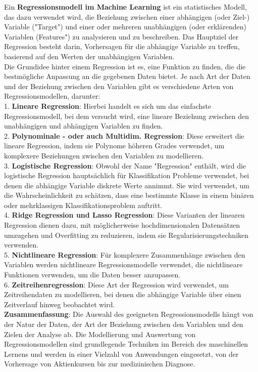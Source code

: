 \documentclass[12pt]{article}
\begin{document}
Ein \textbf{Regressionsmodell im Machine Learning} ist ein statistisches Modell, das dazu verwendet wird, die Beziehung zwischen einer abhängigen (oder Ziel-) Variable ("Target") und einer oder mehreren unabhängigen (oder erklärenden) Variablen (Features") zu analysieren und zu beschreiben. Das Hauptziel der Regression besteht darin, Vorhersagen für die abhängige Variable zu treffen, basierend auf den Werten der unabhängigen Variablen.\\
Die Grundidee hinter einem Regression ist es, eine Funktion zu finden, die die bestmögliche Anpassung an die gegebenen Daten bietet. Je nach Art der Daten und der Beziehung zwischen den Variablen gibt es verschiedene Arten von Regressionsmodellen, darunter:\\[0.2cm] 
% 
1. \textbf{Lineare Regression}: Hierbei handelt es sich um das einfachste Regressionsmodell, bei dem versucht wird, eine lineare Beziehung zwischen den unabhängigen und abhängigen Variablen zu finden.\\[0.2cm]
%  
2. \textbf{Polynominale - oder auch Multidim. Regression}: Diese erweitert die lineare Regression, indem sie Polynome höheren Grades verwendet, um komplexere Beziehungen zwischen den Variablen zu modellieren.\\[0.2cm]
% 
3. \textbf{Logistische Regression}: Obwohl der Name "Regression" enthält, wird die logistische Regression hauptsächlich für Klassifikation Probleme verwendet, bei denen die abhängige Variable diskrete Werte annimmt. Sie wird verwendet, um die Wahrscheinlichkeit zu schätzen, dass eine bestimmte Klasse in einem binären oder mehrklassigen Klassifikationsproblem auftritt.\\[0.2cm]
%  
4. \textbf{Ridge Regression und Lasso Regression}: Diese Varianten der linearen Regression dienen dazu, mit möglicherweise hochdimensionalen Datensätzen umzugehen und Overfitting zu reduzieren, indem sie Regularisierungstechniken verwenden.\\[0.2cm] 
% 
5. \textbf{Nichtlineare Regression}: Für komplexere Zusammenhänge zwischen den Variablen werden nichtlineare Regressionsmodelle verwendet, die nichtlineare Funktionen verwenden, um die Daten besser anzupassen.\\[0.2cm]
% 
6. \textbf{Zeitreihenregression}: Diese Art der Regression wird verwendet, um Zeitreihendaten zu modellieren, bei denen die abhängige Variable über einen Zeitverlauf hinweg beobachtet wird.\\[0.2cm]
% 
\textbf{Zusammenfassung}: Die Auswahl des geeigneten Regressionsmodells hängt von der Natur der Daten, der Art der Beziehung zwischen den Variablen und den Zielen der Analyse ab. Die Modellierung und Auswertung von Regressionsmodellen sind grundlegende Techniken im Bereich des maschinellen Lernens und werden in einer Vielzahl von Anwendungen eingesetzt, von der Vorhersage von Aktienkursen bis zur medizinischen Diagnose. 
\end{document}
